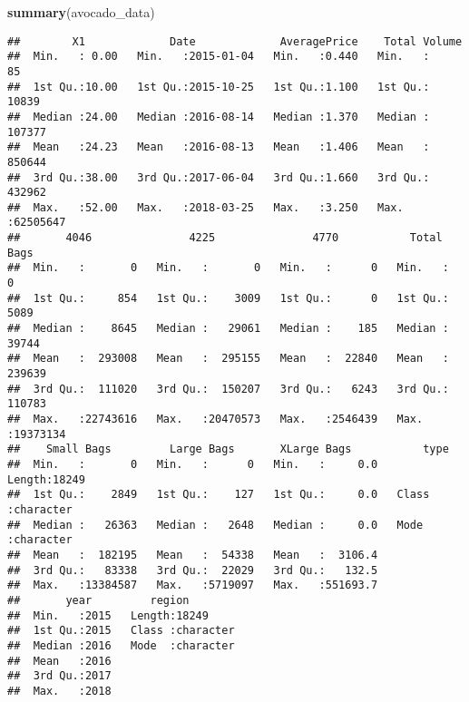 \documentclass[]{book}
\newenvironment{Shaded}{\begin{snugshade}}{\end{snugshade}}
\newcommand{\CommentTok}[1]{\textcolor[rgb]{0.56,0.35,0.01}{\textit{#1}}}
\newcommand{\KeywordTok}[1]{\textcolor[rgb]{0.13,0.29,0.53}{\textbf{#1}}}
\newcommand{\NormalTok}[1]{#1}
\newcommand{\OperatorTok}[1]{\textcolor[rgb]{0.81,0.36,0.00}{\textbf{#1}}}
\begin{document}
\begin{Shaded}
\begin{Highlighting}[]
\KeywordTok{summary}\NormalTok{(avocado_data)}
\end{Highlighting}
\end{Shaded}

\begin{verbatim}
##        X1             Date             AveragePrice    Total Volume     
##  Min.   : 0.00   Min.   :2015-01-04   Min.   :0.440   Min.   :      85  
##  1st Qu.:10.00   1st Qu.:2015-10-25   1st Qu.:1.100   1st Qu.:   10839  
##  Median :24.00   Median :2016-08-14   Median :1.370   Median :  107377  
##  Mean   :24.23   Mean   :2016-08-13   Mean   :1.406   Mean   :  850644  
##  3rd Qu.:38.00   3rd Qu.:2017-06-04   3rd Qu.:1.660   3rd Qu.:  432962  
##  Max.   :52.00   Max.   :2018-03-25   Max.   :3.250   Max.   :62505647  
##       4046               4225               4770           Total Bags      
##  Min.   :       0   Min.   :       0   Min.   :      0   Min.   :       0  
##  1st Qu.:     854   1st Qu.:    3009   1st Qu.:      0   1st Qu.:    5089  
##  Median :    8645   Median :   29061   Median :    185   Median :   39744  
##  Mean   :  293008   Mean   :  295155   Mean   :  22840   Mean   :  239639  
##  3rd Qu.:  111020   3rd Qu.:  150207   3rd Qu.:   6243   3rd Qu.:  110783  
##  Max.   :22743616   Max.   :20470573   Max.   :2546439   Max.   :19373134  
##    Small Bags         Large Bags       XLarge Bags           type          
##  Min.   :       0   Min.   :      0   Min.   :     0.0   Length:18249      
##  1st Qu.:    2849   1st Qu.:    127   1st Qu.:     0.0   Class :character  
##  Median :   26363   Median :   2648   Median :     0.0   Mode  :character  
##  Mean   :  182195   Mean   :  54338   Mean   :  3106.4                     
##  3rd Qu.:   83338   3rd Qu.:  22029   3rd Qu.:   132.5                     
##  Max.   :13384587   Max.   :5719097   Max.   :551693.7                     
##       year         region         
##  Min.   :2015   Length:18249      
##  1st Qu.:2015   Class :character  
##  Median :2016   Mode  :character  
##  Mean   :2016                     
##  3rd Qu.:2017                     
##  Max.   :2018
\end{verbatim}

\begin{Shaded}
\end{Shaded}
\end{document}
